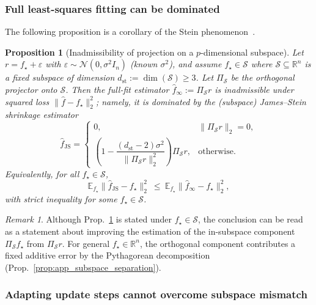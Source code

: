 \documentclass{article}
\theoremstyle{plain}
\newtheorem{proposition}[theorem]{Proposition}
\theoremstyle{definition}
\theoremstyle{remark}
\newtheorem{remark}[theorem]{Remark}
\begin{document}
\subsubsection{Full least-squares fitting can be dominated}\label{app:stein_rigorous}

The following proposition is a corollary of the Stein phenomenon~\citep{JamesStein1961Estimation,10.1214/aos/1176325640}.

\begin{proposition}[Inadmissibility of projection on a $p$-dimensional subspace]
\label{prop:projection_ols_inadmissible}
Let $r=f_\star+\varepsilon$ with $\varepsilon\sim\mathcal N(0,\sigma^2 I_n)$ (known $\sigma^2$),
and assume $f_\star\in\mathcal{S}$ where $\mathcal{S}\subseteq\mathbb R^n$ is a fixed subspace of
dimension $d_{\mathrm{st}}:=\dim(\mathcal{S})\ge 3$. Let $\Pi_{\mathcal{S}}$ be the orthogonal projector onto $\mathcal{S}$.
Then the full-fit estimator $\hat f_\infty := \Pi_{\mathcal{S}} r$ is inadmissible under squared loss $\|\hat f-f_\star\|_2^2$; namely, it is dominated by the (subspace) James--Stein shrinkage estimator
\[
\hat f_{\mathrm{JS}}
=
\begin{cases}
0, & \|\Pi_{\mathcal{S}} r\|_2=0,\\[0.6ex]
\left(1-\dfrac{(d_{\mathrm{st}}-2)\sigma^2}{\|\Pi_{\mathcal{S}} r\|_2^2}\right)\Pi_{\mathcal{S}} r,
& \text{otherwise}.
\end{cases}
\]
Equivalently, for all $f_\star\in\mathcal{S}$,
\[
\mathbb E_{f_\star}\|\hat f_{\mathrm{JS}}-f_\star\|_2^2
\ \le\
\mathbb E_{f_\star}\|\hat f_{\infty}-f_\star\|_2^2,
\]
with strict inequality for some $f_\star\in\mathcal{S}$.
\end{proposition}

\begin{remark}
Although Prop.~\ref{prop:projection_ols_inadmissible} is stated under $f_\star\in\mathcal S$, the conclusion can be read as a statement about improving the estimation of the in-subspace component $\Pi_{\mathcal S}f_\star$ from $\Pi_{\mathcal S}r$. For general $f_\star\in\mathbb R^n$, the orthogonal component contributes a fixed additive error by the Pythagorean decomposition
(Prop.~\ref{prop:app_subspace_separation}).
\end{remark}

\subsubsection{Adapting update steps cannot overcome subspace mismatch}\label{app:subspace_sep_rigorous}
\end{document}
